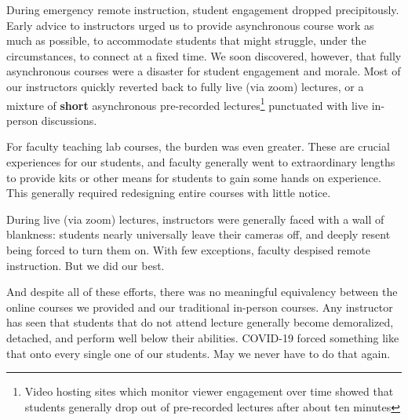 \documentclass[12pt]{article}
\begin{document}
During emergency remote instruction, student engagement dropped
precipitously.  Early advice to instructors urged us to provide
asynchronous course work as much as possible, to accommodate students
that might struggle, under the circumstances, to connect at a fixed
time.  We soon discovered, however, that fully asynchronous courses
were a disaster for student engagement and morale.  Most of our instructors
quickly reverted back to fully live (via zoom) lectures, or a mixture of
{\bf short} asynchronous pre-recorded lectures\footnote{Video hosting
  sites which monitor viewer engagement over time showed that students
  generally drop out of pre-recorded lectures after about ten minutes}
punctuated with live in-person discussions.

For faculty teaching lab courses, the burden was even greater.  These
are crucial experiences for our students, and faculty generally went
to extraordinary lengths to provide kits or other means for students
to gain some hands on experience.  This generally required redesigning
entire courses with little notice.

During live (via zoom) lectures, instructors were generally faced with
a wall of blankness: students nearly universally leave their cameras
off, and deeply resent being forced to turn them on.  With few
exceptions, faculty despised remote instruction.  But we did our best.

And despite all of these efforts, there was no meaningful equivalency
between the online courses we provided and our traditional in-person
courses.  Any instructor has seen that students that do not attend
lecture generally become demoralized, detached, and perform well below
their abilities.  COVID-19 forced something like that onto every
single one of our students.  May we never have to do that again.
\end{document}
